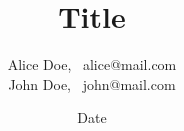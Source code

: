 
\newcommand{\reportTitle}{Title}
\newcommand{\reportSubtitle}{Subtitle}
\newcommand{\reportDate}{Date}

\newcommand{\courseName}{Compiler Construction}
\newcommand{\courseId}{course-id}
\newcommand{\courseTeacher}{David Doe}

\newcommand{\authorOneName}{Alice}
\newcommand{\authorOneFullname}{Alice Doe}
\newcommand{\authorOneMail}{alice@mail.com}
\newcommand{\authorOneId}{12345679}

\newcommand{\authorTwoName}{John}
\newcommand{\authorTwoFullname}{John Doe}
\newcommand{\authorTwoMail}{john@mail.com}
\newcommand{\authorTwoId}{12345678}

\newcommand{\authors}{
	\authorOneFullname,~ \authorOneMail \\
	\authorTwoFullname,~ \authorTwoMail
}

\newcommand{\authorsLine}{\authorOneName, \authorTwoName}

\newcommand{\authorsTable}{
	\begin{tabular}{ll}
		\hline
		Name & Mail \\
		\hline
		\authorOneFullname & \authorOneMail \\
		\authorTwoFullname & \authorTwoMail
	\end{tabular}
}


\title{\reportTitle}
\author{\authors}
\date{\reportDate}


\newcommand{\frontpageBottom}{
Det Naturvidenskabelige Fakultet \\
Syddansk Universitet \\
Danmark
}

\newcommand{\pagefrontLeft}{\authorsLine}
\newcommand{\pagefrontCenter}{}
\newcommand{\pagefrontRight}{\courseId}

\newcommand{\pagemiddleLeft}{\authorsLine}
\newcommand{\pagemiddleCenter}{}
\newcommand{\pagemiddleRight}{\courseId}

\newcommand{\pagebackLeft}{\authorsLine}
\newcommand{\pagebackCenter}{}
\newcommand{\pagebackRight}{\courseId}
